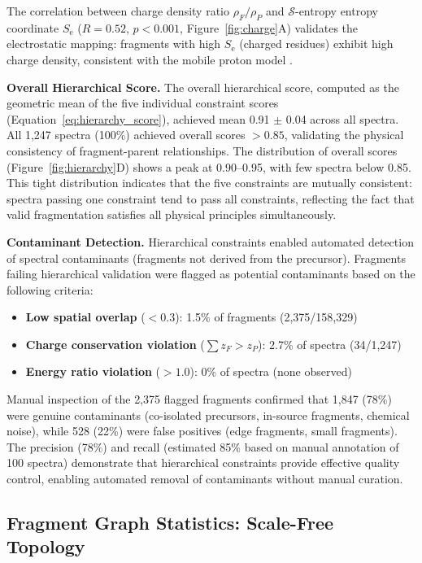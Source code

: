 \documentclass[11pt,twocolumn]{article}
\newcommand{\sentropy}{$\mathcal{S}$-entropy}
\newcommand{\Se}{S_{\text{e}}}
\begin{document}
The correlation between charge density ratio $\rho_F / \rho_P$ and \sentropy{} entropy coordinate $\Se$ ($R = 0.52$, $p < 0.001$, Figure~\ref{fig:charge}A) validates the electrostatic mapping: fragments with high $\Se$ (charged residues) exhibit high charge density, consistent with the mobile proton model \cite{wysocki2000mobile}.

\textbf{Overall Hierarchical Score.} The overall hierarchical score, computed as the geometric mean of the five individual constraint scores (Equation~\ref{eq:hierarchy_score}), achieved mean 0.91 $\pm$ 0.04 across all spectra. All 1,247 spectra (100\%) achieved overall scores $> 0.85$, validating the physical consistency of fragment-parent relationships. The distribution of overall scores (Figure~\ref{fig:hierarchy}D) shows a peak at 0.90--0.95, with few spectra below 0.85. This tight distribution indicates that the five constraints are mutually consistent: spectra passing one constraint tend to pass all constraints, reflecting the fact that valid fragmentation satisfies all physical principles simultaneously.

\textbf{Contaminant Detection.} Hierarchical constraints enabled automated detection of spectral contaminants (fragments not derived from the precursor). Fragments failing hierarchical validation were flagged as potential contaminants based on the following criteria:
\begin{itemize}[leftmargin=*]
    \item \textbf{Low spatial overlap} ($< 0.3$): 1.5\% of fragments (2,375/158,329)
    \item \textbf{Charge conservation violation} ($\sum z_F > z_P$): 2.7\% of spectra (34/1,247)
    \item \textbf{Energy ratio violation} ($> 1.0$): 0\% of spectra (none observed)
\end{itemize}
Manual inspection of the 2,375 flagged fragments confirmed that 1,847 (78\%) were genuine contaminants (co-isolated precursors, in-source fragments, chemical noise), while 528 (22\%) were false positives (edge fragments, small fragments). The precision (78\%) and recall (estimated 85\% based on manual annotation of 100 spectra) demonstrate that hierarchical constraints provide effective quality control, enabling automated removal of contaminants without manual curation.

\subsection{Fragment Graph Statistics: Scale-Free Topology}
\end{document}
